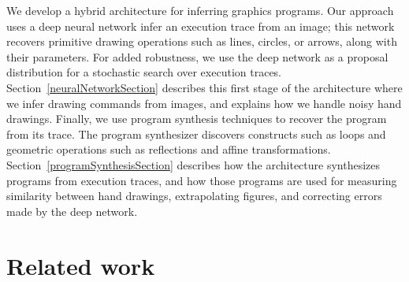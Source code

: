 \documentclass{article}
\newcommand{\remark}[1]{\textcolor{red}{[#1]}}
\begin{document}
We develop a hybrid architecture for inferring graphics programs.  Our
approach uses a deep neural network infer an execution trace from an
image; this network recovers primitive drawing operations such as
lines, circles, or arrows, along with their parameters. For added
robustness, we use the deep network as a proposal distribution for a
stochastic search over execution traces.  Section~\ref{neuralNetworkSection} describes this first stage of the architecture where we infer drawing commands from images, and explains how we handle noisy hand drawings.
Finally, we use program synthesis techniques to recover the program from its
trace.  The program synthesizer discovers constructs such as loops and
geometric operations such as reflections and affine transformations.
Section~\ref{programSynthesisSection} describes how the architecture
synthesizes programs from execution traces,
and how those programs are used for measuring similarity between hand drawings,
extrapolating figures, and correcting errors made by the deep network.





\section{Related work}
\end{document}
